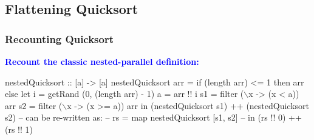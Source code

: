 \documentclass{beamer}
\newcommand{\blue}[1]{\textcolor{Blue}{{#1}}}
\renewcommand{\emph}[1]{\textcolor{structure}{#1}}
\newcommand{\emp}[1]{\textcolor{DikuRed}{ #1}}
\newcommand{\mymath}[1]{$ #1 $}
\begin{document}

\subsection{Flattening Quicksort}

\begin{frame}[fragile]
	\tableofcontents[currentsubsection]
\end{frame}

\begin{frame}[fragile,t]
  \frametitle{Recounting Quicksort}

\blue{\bf Recount the classic nested-parallel definition:}
\bigskip

\begin{colorcode}[fontsize=\scriptsize]
nestedQuicksort :: [a] -> [a]
nestedQuicksort arr = 
  if (length arr) <= 1 then arr else 
  let i = getRand (0, (length arr) - 1)
      a = arr !! i
      s1 = filter (\mymath{\backslash}x -> (x <  a)) arr
      s2 = filter (\mymath{\backslash}x -> (x >= a)) arr
  in  \emp{(nestedQuicksort s1) ++ (nestedQuicksort s2)}
  -- can be re-written as:
  -- rs = \emph{map nestedQuicksort} [s1, s2]
  -- in (rs !! 0) ++ (rs !! 1)
\end{colorcode}

%
\end{frame}
\end{document}
